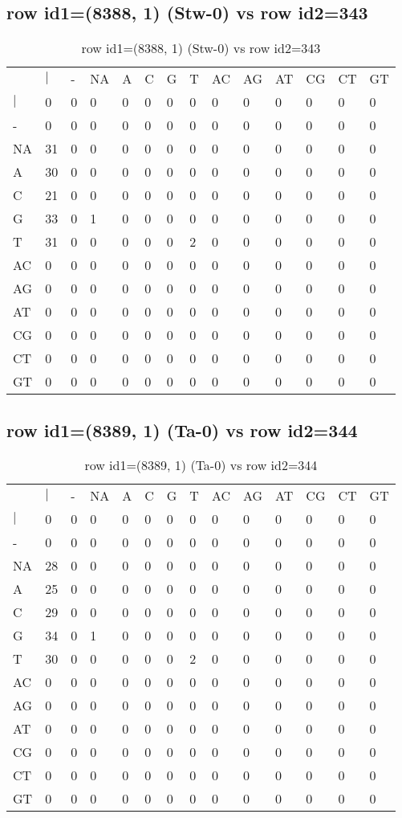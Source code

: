 \subsection{row id1=(8388, 1) (Stw-0) vs row id2=343}
\begin{center}
\begin{longtable}{|l|l|l|l|l|l|l|l|l|l|l|l|l|l|}
\caption{row id1=(8388, 1) (Stw-0) vs row id2=343} \label{table_dm638}\\
\hline
\\
\hline
&$|$&-&NA&A&C&G&T&AC&AG&AT&CG&CT&GT\\
$|$&0&0&0&0&0&0&0&0&0&0&0&0&0\\
-&0&0&0&0&0&0&0&0&0&0&0&0&0\\
NA&31&0&0&0&0&0&0&0&0&0&0&0&0\\
A&30&0&0&0&0&0&0&0&0&0&0&0&0\\
C&21&0&0&0&0&0&0&0&0&0&0&0&0\\
G&33&0&1&0&0&0&0&0&0&0&0&0&0\\
T&31&0&0&0&0&0&2&0&0&0&0&0&0\\
AC&0&0&0&0&0&0&0&0&0&0&0&0&0\\
AG&0&0&0&0&0&0&0&0&0&0&0&0&0\\
AT&0&0&0&0&0&0&0&0&0&0&0&0&0\\
CG&0&0&0&0&0&0&0&0&0&0&0&0&0\\
CT&0&0&0&0&0&0&0&0&0&0&0&0&0\\
GT&0&0&0&0&0&0&0&0&0&0&0&0&0\\
\hline
\end{longtable}
\end{center}

\subsection{row id1=(8389, 1) (Ta-0) vs row id2=344}
\begin{center}
\begin{longtable}{|l|l|l|l|l|l|l|l|l|l|l|l|l|l|}
\caption{row id1=(8389, 1) (Ta-0) vs row id2=344} \label{table_dm640}\\
\hline
\\
\hline
&$|$&-&NA&A&C&G&T&AC&AG&AT&CG&CT&GT\\
$|$&0&0&0&0&0&0&0&0&0&0&0&0&0\\
-&0&0&0&0&0&0&0&0&0&0&0&0&0\\
NA&28&0&0&0&0&0&0&0&0&0&0&0&0\\
A&25&0&0&0&0&0&0&0&0&0&0&0&0\\
C&29&0&0&0&0&0&0&0&0&0&0&0&0\\
G&34&0&1&0&0&0&0&0&0&0&0&0&0\\
T&30&0&0&0&0&0&2&0&0&0&0&0&0\\
AC&0&0&0&0&0&0&0&0&0&0&0&0&0\\
AG&0&0&0&0&0&0&0&0&0&0&0&0&0\\
AT&0&0&0&0&0&0&0&0&0&0&0&0&0\\
CG&0&0&0&0&0&0&0&0&0&0&0&0&0\\
CT&0&0&0&0&0&0&0&0&0&0&0&0&0\\
GT&0&0&0&0&0&0&0&0&0&0&0&0&0\\
\hline
\end{longtable}
\end{center}

